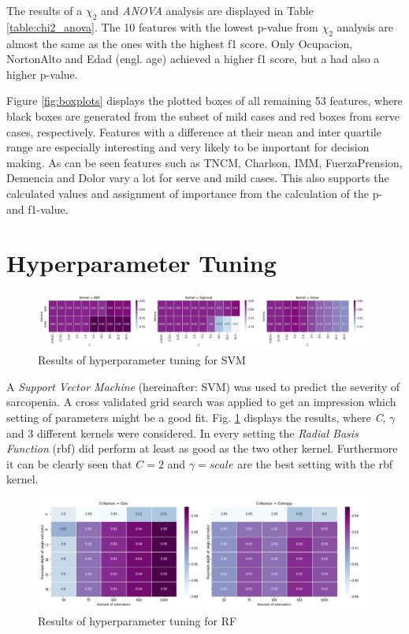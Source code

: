\documentclass[11pt]{article}
\begin{document}
The results of a $\chi_2$ and \emph{ANOVA} analysis are displayed in Table \ref{table:chi2_anova}. The 10 features with the lowest p-value from $\chi_2$ analysis are almost the same as the ones with the highest f1 score. Only Ocupacion, NortonAlto and Edad (engl. age) achieved a higher f1 score, but a had also a higher p-value.


Figure \ref{fig:boxplots} displays the plotted boxes of all remaining 53 features, where black boxes are generated from the subset of mild cases and red boxes from serve cases, respectively. Features with a difference at their mean and inter quartile range are especially interesting and very likely to be important for decision making. As can be seen features such as TNCM, Charlson, IMM, FuerzaPrension, Demencia and Dolor vary a lot for serve and mild cases. This also supports the calculated values and assignment of importance from the calculation of the p- and f1-value.

\section{Hyperparameter Tuning}
\begin{figure}[t]
\includegraphics[width=\linewidth]{heatmap_svc_hyperparameter.png}
\caption{Results of hyperparameter tuning for SVM}
\label{fig:hyper_svc}
\end{figure}

A \emph{Support Vector Machine} (hereinafter: SVM) was used to predict the severity of sarcopenia. A cross validated grid search was applied to get an impression which setting of parameters might be a good fit. Fig. \ref{fig:hyper_svc} displays the results, where \emph{C}, $\gamma$ and 3 different kernels were considered. In every setting the \emph{Radial Basis Function} (rbf) did perform at least as good as the two other kernel. Furthermore it can be clearly seen that $C=2$ and $\gamma=scale$ are the best setting with the rbf kernel.

\begin{figure}[t]
\includegraphics[width=\linewidth]{heatmap_rf_hyperparameter.png}
\caption{Results of hyperparameter tuning for RF}
\label{fig:hyper_rf}
\end{figure}
\end{document}

